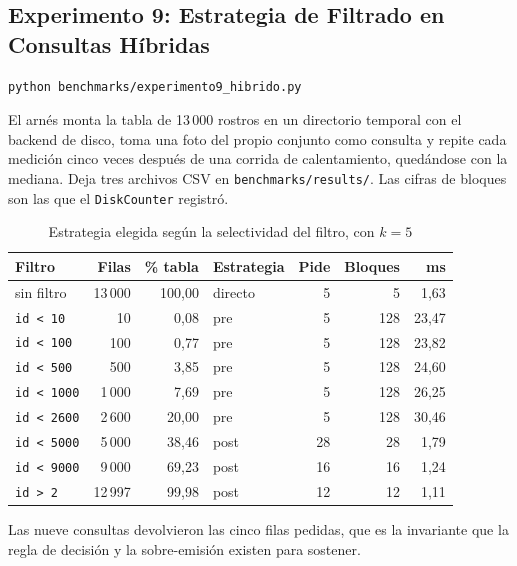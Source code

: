 \documentclass[a4paper,12pt]{article}
\begin{document}
\subsection{Experimento 9: Estrategia de Filtrado en Consultas Híbridas}

\begin{lstlisting}[language=bash, caption={Ejecución del experimento}]
python benchmarks/experimento9_hibrido.py
\end{lstlisting}

El arnés monta la tabla de 13\,000 rostros en un directorio temporal con el
backend de disco, toma una foto del propio conjunto como consulta y repite cada
medición cinco veces después de una corrida de calentamiento, quedándose con la
mediana. Deja tres archivos CSV en \texttt{benchmarks/results/}. Las cifras de
bloques son las que el \texttt{DiskCounter} registró.

\begin{table}[H]
\centering
\caption{Estrategia elegida según la selectividad del filtro, con $k = 5$}
\begin{tabular}{@{}lrrlrrr@{}}
\toprule
\textbf{Filtro} & \textbf{Filas} & \textbf{\% tabla} & \textbf{Estrategia} &
\textbf{Pide} & \textbf{Bloques} & \textbf{ms} \\
\midrule
sin filtro & 13\,000 & 100{,}00 & directo & 5 & 5 & 1{,}63 \\
\texttt{id \textless{} 10} & 10 & 0{,}08 & pre & 5 & 128 & 23{,}47 \\
\texttt{id \textless{} 100} & 100 & 0{,}77 & pre & 5 & 128 & 23{,}82 \\
\texttt{id \textless{} 500} & 500 & 3{,}85 & pre & 5 & 128 & 24{,}60 \\
\texttt{id \textless{} 1000} & 1\,000 & 7{,}69 & pre & 5 & 128 & 26{,}25 \\
\texttt{id \textless{} 2600} & 2\,600 & 20{,}00 & pre & 5 & 128 & 30{,}46 \\
\texttt{id \textless{} 5000} & 5\,000 & 38{,}46 & post & 28 & 28 & 1{,}79 \\
\texttt{id \textless{} 9000} & 9\,000 & 69{,}23 & post & 16 & 16 & 1{,}24 \\
\texttt{id \textgreater{} 2} & 12\,997 & 99{,}98 & post & 12 & 12 & 1{,}11 \\
\bottomrule
\end{tabular}
\end{table}

Las nueve consultas devolvieron las cinco filas pedidas, que es la invariante
que la regla de decisión y la sobre-emisión existen para sostener.
\end{document}
